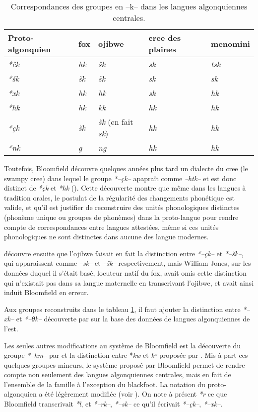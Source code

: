 \documentclass[twoside,a4paper,11pt]{article}
\newcommand{\ipa}[1]{{\phon\textit{#1}}}
\newcommand{\Σ}{\greek{Σ}}
\begin{document}
\begin{table}[H]
\caption{Correspondances des groupes en --k-- dans les langues algonquiennes centrales.} \centering  \label{tab:clusters.k}
\begin{tabular}{lllll}
\toprule
Proto-algonquien & fox & ojibwe & cree des plaines & menomini \\
\midrule
\ipa{*čk} & \ipa{hk} & \ipa{šk} & \ipa{sk} & \ipa{tsk} \\
\ipa{*šk} & \ipa{šk} & \ipa{šk} & \ipa{sk} & \ipa{sk} \\
\ipa{*xk} & \ipa{hk} & \ipa{hk} & \ipa{sk} & \ipa{hk} \\
\ipa{*hk} & \ipa{hk} & \ipa{kk} & \ipa{hk} & \ipa{hk} \\
\ipa{*çk} & \ipa{šk} & \ipa{šk} (en fait \ipa{sk}) & \ipa{hk} & \ipa{hk} \\
\ipa{*nk} & \ipa{g} & \ipa{ng} & \ipa{hk} & \ipa{hk} \\
\bottomrule
\end{tabular}
\end{table}

Toutefois, Bloomfield découvre quelques années plus tard un dialecte du cree (le swampy cree) dans lequel le groupe \ipa{*--çk--} apapraît comme \ipa{--htk--} et est donc distinct de \ipa{*çk}  et \ipa{*hk} (\citealt{bloomfield28thk}). Cette découverte montre que même dans les langues à tradition orales, le postulat de la régularité des changements phonétique est valide, et qu'il est justifier de reconstruire des unités phonologiques distinctes (phonème unique ou groupes de phonèmes) dans la proto-langue pour rendre compte de correspondances entre langues attestées, même si ces unités phonologiques ne sont distinctes dans aucune des langue modernes. 

\citet{bloomfield46proto} découvre ensuite que l'ojibwe faisait en fait la distinction entre  \ipa{*--çk--} et \ipa{*--šk--}, qui apparaissent comme \ipa{--sk--} et \ipa{--šk--} respectivement, mais William Jones, sur les données duquel il s'était basé, locuteur natif du fox, avait omis cette distinction qui n'existait pas dans sa langue maternelle en transcrivant l'ojibwe, et avait ainsi induit Bloomfield en erreur.

Aux groupes reconstruits dans le tableau \ref{tab:clusters.k}, il faut ajouter la distinction entre \ipa{*--xk--} et \ipa{*--θk--} découverte par \citet{siebert41clusters} sur la base des données de langues algonquiennes de l'est. 

Les seules autres modifications au système de Bloomfield est la découverte du groupe  \ipa{*--hm--} par \citet{goddard79comparative} et la distinction entre *\ipa{kw} et \ipa{kʷ} proposée par \citet{pentland79phd}. Mis à part ces quelques groupes mineurs, le système   proposé  par Bloomfield permet de rendre compte non seulement des langues algonquiennes centrales, mais en fait de l'ensemble de la famille à l'exception du blackfoot. La notation du proto-algonquien a été légèrement modifiée (voir \citealt{goddard98arapaho}). On note à présent \ipa{*r} ce que Bloomfield transcrivait \ipa{*l}, et \ipa{*--rk--},  \ipa{*--sk--} ce qu'il écrivait \ipa{*--çk--},  \ipa{*--xk--}.
\end{document}
